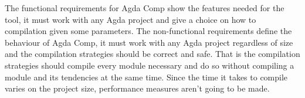 The functional requirements for Agda Comp show the features needed for the
tool, it must work with any Agda project and give a choice on how to
compilation given some parameters. The non-functional requirements define the
behaviour of Agda Comp, it must work with any Agda project regardless of size
and the compilation strategies should be correct and safe. That is the
compilation strategies should compile every module necessary and do so without
compiling a module and its tendencies at the same time. Since the time it takes
to compile varies on the project size, performance measures aren't going to be
made.


%

